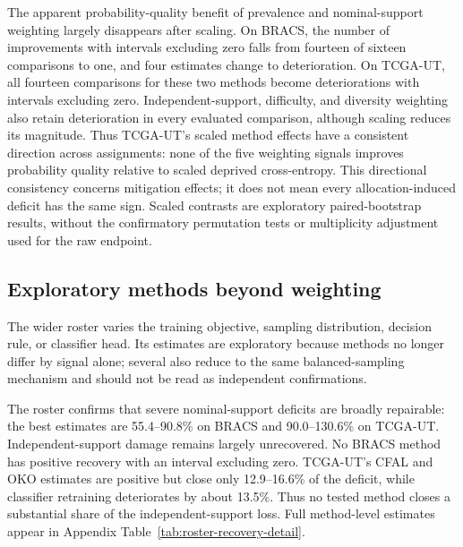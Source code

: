 \documentclass[11pt]{article}
\newcommand{\resultstable}[1]{}
\begin{document}
The apparent probability-quality benefit of prevalence and nominal-support weighting largely disappears after scaling. On BRACS, the number of improvements with intervals excluding zero falls from fourteen of sixteen comparisons to one, and four estimates change to deterioration. On TCGA-UT, all fourteen comparisons for these two methods become deteriorations with intervals excluding zero. Independent-support, difficulty, and diversity weighting also retain deterioration in every evaluated comparison, although scaling reduces its magnitude. Thus TCGA-UT's scaled method effects have a consistent direction across assignments: none of the five weighting signals improves probability quality relative to scaled deprived cross-entropy. This directional consistency concerns mitigation effects; it does not mean every allocation-induced deficit has the same sign. Scaled contrasts are exploratory paired-bootstrap results, without the confirmatory permutation tests or multiplicity adjustment used for the raw endpoint.

\subsection{Exploratory methods beyond weighting}
\label{sec:rq2-roster}
The wider roster varies the training objective, sampling distribution, decision rule, or classifier head. Its estimates are exploratory because methods no longer differ by signal alone; several also reduce to the same balanced-sampling mechanism and should not be read as independent confirmations.

\begin{table}[ht]
  \centering
  \small
  \resultstable{roster_recovery_summary}
  \caption{Most informative recovery results from the exploratory method roster.}
  \label{tab:roster-recovery}
\end{table}

\noindent The roster confirms that severe nominal-support deficits are broadly repairable: the best estimates are \num{55.4}--\num{90.8}\% on BRACS and \num{90.0}--\num{130.6}\% on TCGA-UT. Independent-support damage remains largely unrecovered. No BRACS method has positive recovery with an interval excluding zero. TCGA-UT's CFAL and OKO estimates are positive but close only \num{12.9}--\num{16.6}\% of the deficit, while classifier retraining deteriorates by about \num{13.5}\%. Thus no tested method closes a substantial share of the independent-support loss. Full method-level estimates appear in Appendix Table~\ref{tab:roster-recovery-detail}.
\end{document}
